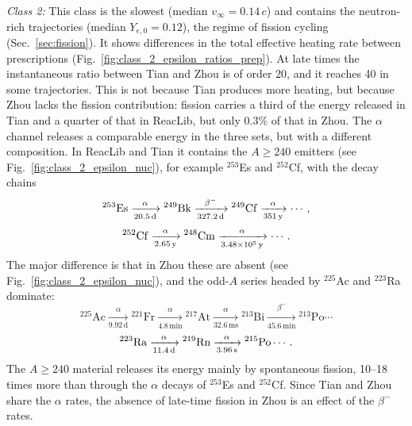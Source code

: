 \textit{Class 2:}
This class is the slowest (median $v_\infty=0.14\,c$) and contains the neutron-rich trajectories (median $Y_{e,0}=0.12$), the regime of fission cycling (Sec.~\ref{sec:fission}).
It shows differences in the total effective heating rate between prescriptions (Fig.~\ref{fig:class_2_epsilon_ratios_prep}).
At late times the instantaneous ratio between Tian and Zhou is of order 20, and it reaches 40 in some trajectories.
This is not because Tian produces more heating, but because Zhou lacks the fission contribution: fission carries a third of the energy released in Tian and a quarter of that in ReacLib, but only $0.3\%$ of that in Zhou.
The $\alpha$ channel releases a comparable energy in the three sets, but with a different composition.
In ReacLib and Tian it contains the $A\geq240$ emitters (see Fig.~\ref{fig:class_2_epsilon_nuc}), for example ${}^{253}$Es and ${}^{252}$Cf, with the decay chains
\begin{equation}
  {}^{253}\mathrm{Es} \xrightarrow[20.5 \, {\rm d}] {\alpha}{}^{249}\mathrm{Bk} \xrightarrow[327.2 {\rm \, d}] {\beta^-} {}^{249}\mathrm{Cf} \xrightarrow [351 \,{\rm y}] {\alpha} \cdots ,
\end{equation}
\begin{equation}
  {}^{252}\mathrm{Cf} \xrightarrow[2.65 \, {\rm y}] {\alpha}{}^{248}\mathrm{Cm} \xrightarrow[3.48 \times 10^{5} {\rm \, y}] {\alpha} \cdots .
\end{equation}
The major difference is that in Zhou these are absent (see Fig.~\ref{fig:class_2_epsilon_nuc}), and the odd-$A$ series headed by ${}^{225}$Ac and ${}^{223}$Ra dominate:
\begin{equation}\label{chain:225Ac}
  {}^{225}\mathrm{Ac} \xrightarrow[9.92\,\mathrm{d}]{\alpha}{}^{221}\mathrm{Fr} \xrightarrow[4.8\,\mathrm{min}]{\alpha}{}^{217}\mathrm{At} \xrightarrow[32.6\,\mathrm{ms}]{\alpha}{}^{213}\mathrm{Bi}\xrightarrow[45.6\,\mathrm{min}]{\beta^{-}}{}^{213}\mathrm{Po}\cdots
\end{equation}
\begin{equation}
  {}^{223}\mathrm{Ra} \xrightarrow[11.4 \, {\rm d}] {\alpha}{}^{219}\mathrm{Rn} \xrightarrow[3.96 {\rm \, s}] {\alpha} {}^{215}\mathrm{Po}\cdots.
\end{equation}
The $A\geq240$ material releases its energy mainly by spontaneous fission, 10--18 times more than through the $\alpha$ decays of ${}^{253}$Es and ${}^{252}$Cf.
Since Tian and Zhou share the $\alpha$ rates, the absence of late-time fission in Zhou is an effect of the $\beta^-$ rates.

